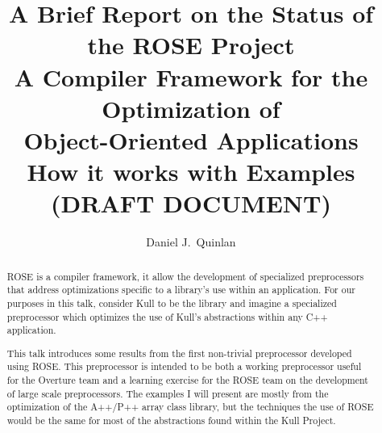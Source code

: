 \documentclass[10pt]{article}
\begin{document}
\title{     A Brief Report on the Status of the  ROSE Project \\
              A Compiler Framework for the Optimization of \\ 
                    Object-Oriented Applications \\
                      How it works with Examples \\
                           (DRAFT DOCUMENT) } 

\author{Daniel J.\ Quinlan }

\date{}

\maketitle

\tableofcontents


\begin{abstract}
   ROSE is a compiler framework, it allow the development of specialized
preprocessors that address optimizations specific to a library's use within an application. For our
purposes in this talk, consider Kull to be the library and imagine a specialized preprocessor which
optimizes the use of Kull's abstractions within any C++ application.

   This talk introduces some results from the first non-trivial preprocessor developed using ROSE.
This preprocessor is intended to be both a working preprocessor useful for the Overture team and a
learning exercise for the ROSE team on the development of large scale preprocessors.  The examples I
will present are mostly from the optimization of the A++/P++ array class library, but the techniques
the use of ROSE would be the same for most of the abstractions found within the Kull Project.
\end{abstract}


\end{document}
